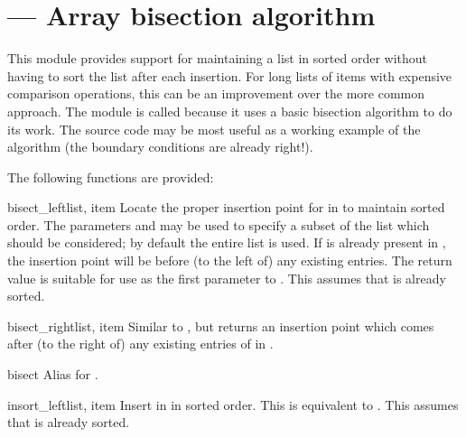 \section{ ---
         Array bisection algorithm}



This module provides support for maintaining a list in sorted order
without having to sort the list after each insertion.  For long lists
of items with expensive comparison operations, this can be an
improvement over the more common approach.  The module is called
 because it uses a basic bisection algorithm to do its
work.  The source code may be most useful as a working example of the
algorithm (the boundary conditions are already right!).

The following functions are provided:

\begin{funcdesc}{bisect_left}{list, item}
  Locate the proper insertion point for  in  to
  maintain sorted order.  The parameters  and  may be
  used to specify a subset of the list which should be considered; by
  default the entire list is used.  If  is already present
  in , the insertion point will be before (to the left of)
  any existing entries.  The return value is suitable for use as the
  first parameter to .  This assumes that
   is already sorted.
\end{funcdesc}

\begin{funcdesc}{bisect_right}{list, item}
  Similar to , but returns an insertion point
  which comes after (to the right of) any existing entries of
   in .
\end{funcdesc}

\begin{funcdesc}{bisect}{\unspecified}
  Alias for .
\end{funcdesc}

\begin{funcdesc}{insort_left}{list, item}
  Insert  in  in sorted order.  This is equivalent
  to .  This assumes that  is
  already sorted.
\end{funcdesc}

